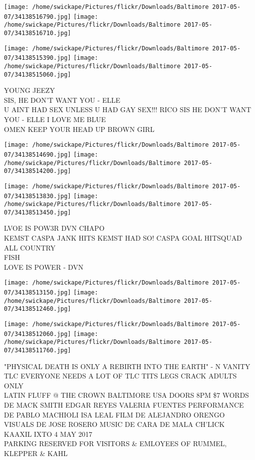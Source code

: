 \documentclass[10pt,letterpaper]{article}
\begin{document}
\texttt{[image: /home/swickape/Pictures/flickr/Downloads/Baltimore 2017-05-07/34138516790.jpg]}
\texttt{[image: /home/swickape/Pictures/flickr/Downloads/Baltimore 2017-05-07/34138516710.jpg]}

\texttt{[image: /home/swickape/Pictures/flickr/Downloads/Baltimore 2017-05-07/34138515390.jpg]}
\texttt{[image: /home/swickape/Pictures/flickr/Downloads/Baltimore 2017-05-07/34138515060.jpg]}

YOUNG JEEZY\\
SIS, HE DON'T WANT YOU {-} ELLE\\
U AINT HAD SEX UNLESS U HAD GAY SEX!!! RICO SIS HE DON'T WANT YOU {-} ELLE I LOVE ME BLUE\\
OMEN KEEP YOUR HEAD UP BROWN GIRL\\
\pagebreak

\texttt{[image: /home/swickape/Pictures/flickr/Downloads/Baltimore 2017-05-07/34138514690.jpg]}
\texttt{[image: /home/swickape/Pictures/flickr/Downloads/Baltimore 2017-05-07/34138514200.jpg]}

\texttt{[image: /home/swickape/Pictures/flickr/Downloads/Baltimore 2017-05-07/34138513830.jpg]}
\texttt{[image: /home/swickape/Pictures/flickr/Downloads/Baltimore 2017-05-07/34138513450.jpg]}

LVOE IS POW3R DVN CHAPO\\
KEMST CASPA JANK HITS KEMST HAD SO! CASPA GOAL HITSQUAD ALL COUNTRY\\
FISH\\
LOVE IS POWER {-} DVN\\
\pagebreak

\texttt{[image: /home/swickape/Pictures/flickr/Downloads/Baltimore 2017-05-07/34138513150.jpg]}
\texttt{[image: /home/swickape/Pictures/flickr/Downloads/Baltimore 2017-05-07/34138512460.jpg]}

\texttt{[image: /home/swickape/Pictures/flickr/Downloads/Baltimore 2017-05-07/34138512060.jpg]}
\texttt{[image: /home/swickape/Pictures/flickr/Downloads/Baltimore 2017-05-07/34138511760.jpg]}

"PHYSICAL DEATH IS ONLY A REBIRTH INTO THE EARTH" {-} N VANITY\\
TLC EVERYONE NEEDS A LOT OF TLC TITS LEGS CRACK ADULTS ONLY\\
LATIN FLUFF @ THE CROWN BALTIMORE USA DOORS 8PM \$7 WORDS DE MACK SMITH EDGAR REYES VALERIA FUENTES PERFORMANCE DE PABLO MACHIOLI ISA LEAL FILM DE ALEJANDRO ORENGO VISUALS DE JOSE ROSERO MUSIC DE CARA DE MALA CH'LICK KAAXIL IXTO 4 MAY 2017\\
PARKING RESERVED FOR VISITORS \& EMLOYEES OF RUMMEL, KLEPPER \& KAHL\\
\pagebreak
\end{document}
